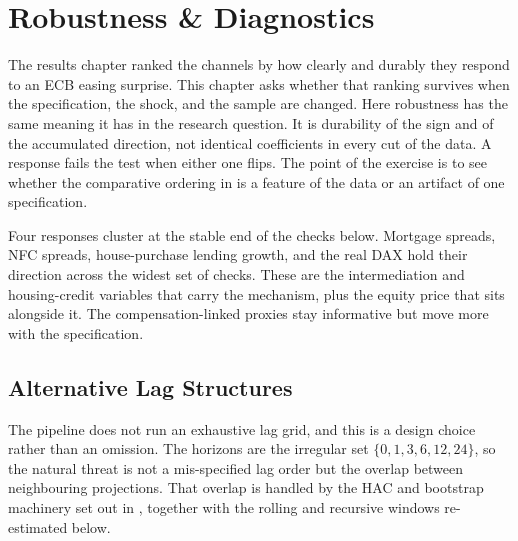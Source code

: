 \chapter{Robustness \& Diagnostics}
\label{chap:robustness}

The results chapter ranked the channels by how clearly and durably they respond to an ECB easing surprise. This chapter asks whether that ranking survives when the specification, the shock, and the sample are changed. Here robustness has the same meaning it has in the research question. It is durability of the sign and of the accumulated direction, not identical coefficients in every cut of the data. A response fails the test when either one flips. The point of the exercise is to see whether the comparative ordering in  is a feature of the data or an artifact of one specification.

Four responses cluster at the stable end of the checks below. Mortgage spreads, NFC spreads, house-purchase lending growth, and the real DAX hold their direction across the widest set of checks. These are the intermediation and housing-credit variables that carry the mechanism, plus the equity price that sits alongside it. The compensation-linked proxies stay informative but move more with the specification.

\section{Alternative Lag Structures}

The pipeline does not run an exhaustive lag grid, and this is a design choice rather than an omission. The horizons are the irregular set \(\{0,1,3,6,12,24\}\), so the natural threat is not a mis-specified lag order but the overlap between neighbouring projections. That overlap is handled by the HAC and bootstrap machinery set out in , together with the rolling and recursive windows re-estimated below.

